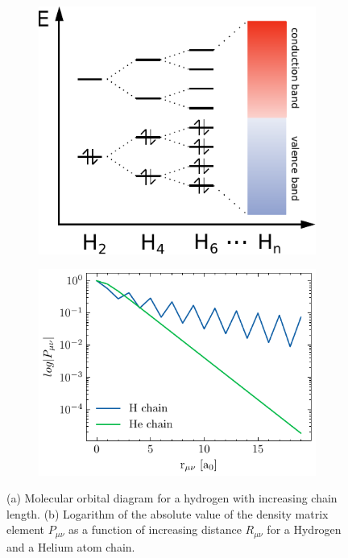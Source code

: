 \begin{figure}
\centering
\begin{subfigure}{0.45\linewidth}
\centering
\includegraphics[scale=0.8]{Pics/MOchain}
\caption{}
\end{subfigure}
\begin{subfigure}{0.45\linewidth}
\centering
\includegraphics[scale=0.8]{density_decay}
\caption{}
\end{subfigure}
\caption{(a) Molecular orbital diagram for a hydrogen with increasing chain length. (b) Logarithm of the absolute value of the density matrix element $P_{\mu\nu}$ as a function of increasing distance $R_{\mu\nu}$ for a Hydrogen and a Helium atom chain.}
\label{fig:HCHAIN_DENSITY}
\end{figure}


